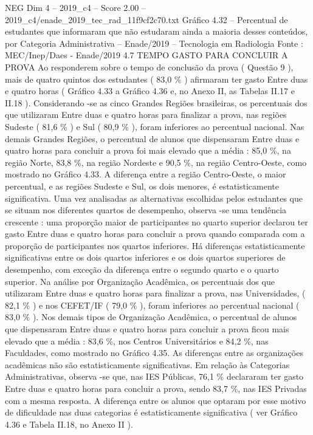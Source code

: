 \begin{textsample}{NEG Dim 4 – 2019\_c4 – Score 2.00 – 2019\_c4/enade\_2019\_tec\_rad\_11f9cf2c70.txt}
Gráfico 4.32 – Percentual de estudantes que informaram que não estudaram ainda a maioria desses conteúdos, por Categoria Administrativa – Enade/2019 – Tecnologia em Radiologia Fonte : MEC/Inep/Daes - Enade/2019 4.7 TEMPO GASTO PARA CONCLUIR A PROVA Ao responderem sobre o tempo de conclusão da prova ( Questão 9 ), mais de quatro quintos dos estudantes ( 83,0 \% ) afirmaram ter gasto Entre duas e quatro horas ( Gráfico 4.33 a Gráfico 4.36 e, no Anexo II, as Tabelas II.17 e II.18 ).
Considerando -se as cinco Grandes Regiões brasileiras, os percentuais dos que utilizaram Entre duas e quatro horas para finalizar a prova, nas regiões Sudeste ( 81,6 \% ) e Sul ( 80,9 \% ), foram inferiores ao percentual nacional.
Nas demais Grandes Regiões, o percentual de alunos que dispensaram Entre duas e quatro horas para concluir a prova foi mais elevado que a média : 85,0 \%, na região Norte, 83,8 \%, na região Nordeste e 90,5 \%, na região Centro-Oeste, como mostrado no Gráfico 4.33.
A diferença entre a região Centro-Oeste, o maior percentual, e as regiões Sudeste e Sul, os dois menores, é estatisticamente significativa.
Uma vez analisadas as alternativas escolhidas pelos estudantes que se situam nos diferentes quartos de desempenho, observa -se uma tendência crescente : uma proporção maior de participantes no quarto superior declarou ter gasto Entre duas e quatro horas para concluir a prova quando comparada com a proporção de participantes nos quartos inferiores.
Há diferenças estatisticamente significativas entre os dois quartos inferiores e os dois quartos superiores de desempenho, com exceção da diferença entre o segundo quarto e o quarto superior.
Na análise por Organização Acadêmica, os percentuais dos que utilizaram Entre duas e quatro horas para finalizar a prova, nas Universidades, ( 82,1 \% ) e nos CEFET/IF ( 79,0 \% ), foram inferiores ao percentual nacional ( 83,0 \% ).
Nos demais tipos de Organização Acadêmica, o percentual de alunos que dispensaram Entre duas e quatro horas para concluir a prova ficou mais elevado que a média : 83,6 \%, nos Centros Universitários e 84,2 \%, nas Faculdades, como mostrado no Gráfico 4.35.
As diferenças entre as organizações acadêmicas não são estatisticamente significativas.
Em relação às Categorias Administrativas, observa -se que, nas IES Públicas, 76,1 \% declararam ter gasto Entre duas e quatro horas para concluir a prova, sendo 83,7 \%, nas IES Privadas com a mesma resposta.
A diferença entre os alunos que optaram por esse motivo de dificuldade nas duas categorias é estatisticamente significativa ( ver Gráfico 4.36 e Tabela II.18, no Anexo II ).

\end{textsample}
